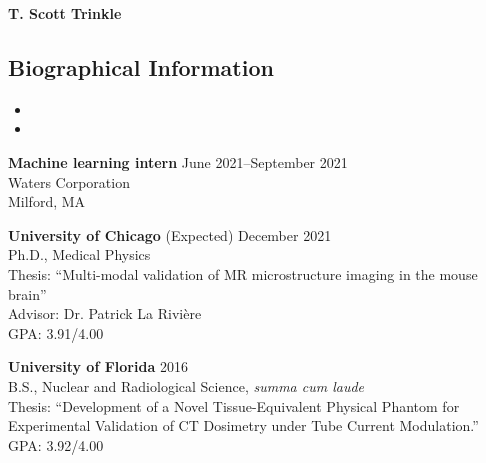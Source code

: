 \documentclass[10pt,letterpaper]{article}
\begin{document}
\begin{center}
{\LARGE \textbf{T. Scott Trinkle}}\\
\end{center}
\vspace{-1em}

\subsection*{Biographical Information}
\begin{itemize}[noitemsep]
\item[]  
\item[]  
\end{itemize}

\begin{etaremune}[labelsep=0.035\textwidth]
\item
  \textbf{Machine learning intern} \hfill June 2021--September 2021\\
  Waters Corporation\\
  Milford, MA
\end{etaremune}

\begin{etaremune}[labelsep=0.035\textwidth]
\item
  \textbf{University of Chicago} \hfill (Expected) December 2021\\
  Ph.D., Medical Physics\\
  Thesis: ``Multi-modal validation of MR microstructure imaging in the mouse brain''\\
  Advisor: Dr. Patrick La Rivi\`ere \\
  GPA: 3.91/4.00\\
\item
  \textbf{University of Florida} \hfill 2016\\
  B.S., Nuclear and Radiological Science, \textit{summa cum laude}\\
  Thesis: ``Development of a Novel Tissue-Equivalent Physical Phantom for Experimental Validation
  of CT Dosimetry under Tube Current Modulation.''\\ 
  GPA: 3.92/4.00\\
\end{etaremune}
\end{document}
